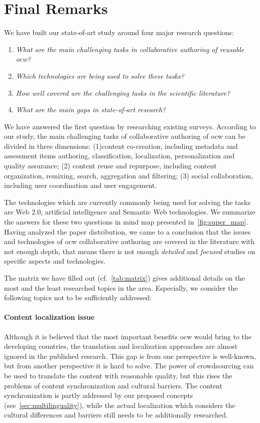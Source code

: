 \documentclass[PhD, Submit, ngerman,UKenglish,table]{scrbook}
\begin{document}
\section{Final Remarks}

We have built our state-of-art study around four major research questions:
\begin{enumerate}

\item \emph{What are the main challenging tasks in collaborative authoring of reusable \gls{ocw}?}
\item \emph{Which technologies are being used to solve these tasks?}
\item \emph{How well covered are the challenging tasks in the scientific literature?}
\item \emph{What are the main gaps in state-of-art research?}

\end{enumerate}


We have answered the first question by researching existing surveys.
According to our study, the main challenging tasks of collaborative authoring of \gls{ocw} can be divided in three dimensions: (1)content co-creation, including metadata and assessment items authoring, classification, localization, personalization and quality assurance; (2) content reuse and repurpose, including content organization, remixing, search, aggregation and filtering; (3) social collaboration, including user coordination and user engagement.

The technologies which are currently commonly being used for solving the tasks are Web 2.0, artificial intelligence and Semantic Web technologies.
We summarize the answers for these two questions in mind map presented in~\autoref{fig:super_map}.
Having analyzed the paper distribution, we came to a conclusion that the issues and technologies of \gls{ocw} collaborative authoring are covered in the literature with not enough depth, that means there is not enough \emph{detailed} and \emph{focused} studies on specific aspects and technologies.

The matrix we have filled out (cf.~\autoref{tab:matrix}) gives additional details on the most and the least researched topics in the area.
Especially, we consider the following topics not to be sufficiently addressed: 

\paragraph{Content localization issue}
Although it is believed that the most important benefits \gls{ocw} would bring to the developing countries, the translation and localization approaches are almost ignored in the published research.
This gap is from one perspective is well-known, but from another perspective it is hard to solve.
The power of crowdsourcing can be used to translate the content with reasonable quality, but this rises the problems of content synchronization and cultural barriers.
The content synchronization is partly addressed by our proposed concepts (see~\autoref{sec:multilinguality}), while the actual localization which considers the cultural differences and barriers still needs to be additionally researched. 
\end{document}
